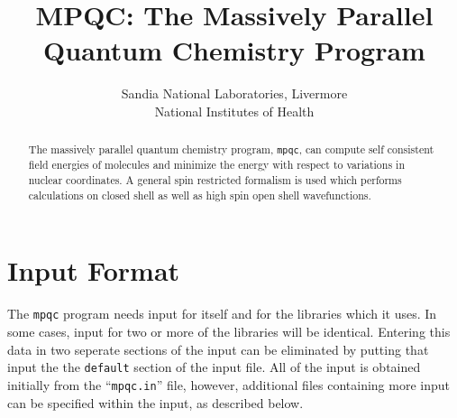 
%
%


\title{MPQC: The Massively Parallel Quantum Chemistry Program}
\author{Sandia National Laboratories, Livermore \\
        National Institutes of Health
        }



\newcommand{\libint}{{\tt libintv2}}
\newcommand{\libdmtscf}{{\tt libdmtscf}}
\newcommand{\libforce}{{\tt libforce}}
\newcommand{\libgeom}{{\tt libgeom}}
\newcommand{\mpqc}{{\tt mpqc}}
\newcommand{\libip}{{\tt libipv2}}

\maketitle

\begin{abstract}
The massively parallel quantum chemistry program, \mpqc{},
can compute self consistent field energies of molecules and
minimize the energy with respect to variations in nuclear
coordinates.  A general spin restricted formalism is used
which performs calculations on closed shell as well as
high spin open shell wavefunctions.
\end{abstract}

\vskip 0.25in
{
\centering
{}
\vskip 0.25in
}

\tableofcontents

\section{Input Format}
The \mpqc{} program needs input for itself and for the libraries which
it uses.  In some cases, input for two or more of the libraries will
be identical.  Entering this data in two seperate sections of the input
can be eliminated by putting that input the the {\tt default} section
of the input file.  All of the input is obtained initially from the
``{\tt mpqc.in}'' file, however, additional files containing more input
can be specified within the input, as described below.

